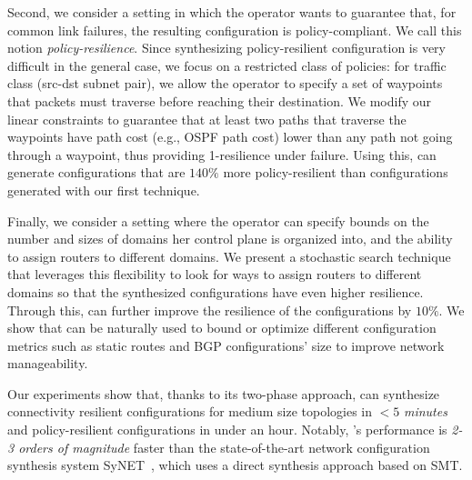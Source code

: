 Second, we consider a setting in which the operator wants to guarantee
that, for common link failures, the resulting configuration is
policy-compliant.  We call this notion \emph{policy-resilience}.
Since synthesizing policy-resilient configuration is very difficult in
the general case, we focus on a {\rm restricted class} of policies:
for traffic class (src-dst subnet pair), we allow the operator to
specify a set of waypoints that packets must traverse before reaching
their destination.  We modify our linear constraints to guarantee that
at least two paths that traverse the waypoints have path cost (e.g.,
OSPF path cost) lower than any path not going through a waypoint, thus
providing 1-resilience under failure. Using this, \name can generate
configurations that are $140\%$ more policy-resilient than
configurations generated with our first technique.

Finally, we consider a setting where the operator can specify bounds
on the number and sizes of domains her control plane is organized
into, and the ability to assign routers to different domains.  We
present a stochastic search technique that leverages this flexibility
to look for ways to assign routers to different domains so that the
synthesized configurations have even higher resilience.  Through this,
\name can further improve the resilience of the configurations by
$10\%$. We show that \name can be naturally used to bound or optimize
different configuration metrics such as static routes and BGP
configurations' size to improve network manageability.

Our experiments show that, thanks to its two-phase approach, \name can
synthesize connectivity resilient configurations for medium size
topologies in $< 5$ {\em minutes} and policy-resilient configurations
in under an hour.  Notably, \name's performance is {\em 2-3 orders of
  magnitude} faster than the state-of-the-art network configuration
synthesis system SyNET~\cite{synet}, which uses a direct synthesis
approach based on SMT.

